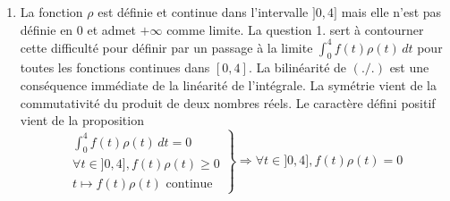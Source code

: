 \begin{enumerate}
\begin{enumerate}
\end{enumerate}

  \item La fonction $\rho$ est définie et continue dans l'intervalle $]0,4]$ mais elle n'est pas définie en $0$ et admet $+\infty$ comme limite. La question 1. sert à contourner cette difficulté pour définir par un passage à la limite $\int_0^4f(t)\rho(t)\,dt$ pour toutes les fonctions continues dans $[0,4]$.\newline
La bilinéarité de $(./.)$ est une conséquence immédiate de la linéarité de l'intégrale. La symétrie vient de la commutativité du produit de deux nombres réels. Le caractère défini positif vient de la proposition
\begin{displaymath}
\left. 
\begin{aligned}
\int_0^4 f(t)\rho(t)\,dt = 0\\ \forall t \in]0,4], f(t)\rho(t) \geq 0 \\ t\mapsto f(t)\rho(t) \text{ continue}   
\end{aligned}
\right\rbrace 
\Rightarrow \forall t \in]0,4], f(t)\rho(t) = 0
\end{displaymath}



\end{enumerate}
